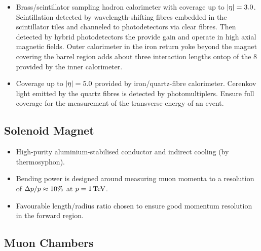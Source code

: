 \begin{itemize}
    \item Brass/scintillator sampling hadron calorimeter with coverage up to
        ${|\eta|=3.0}$. Scintillation detected by wavelength-shifting fibres
        embedded in the scintillator tiles and channeled to photodetectors
        via clear fibres. Then detected by hybrid photodetectors the provide
        gain and operate in high axial magnetic fields. Outer calorimeter
        in the iron return yoke beyond the magnet covering the barrel region
        adds about three interaction lengths ontop of the 8 provided by the
        inner calorimeter.
    \item Coverage up to ${|\eta|=5.0}$ provided by iron/quartz-fibre
        calorimeter. Cerenkov light emitted by the quartz fibres is detected by
        photomultiplers. Ensure full coverage for the measurement of the
        transverse energy of an event.
\end{itemize}

\subsection{Solenoid Magnet}

\begin{itemize}
    \item High-purity aluminium-stabilised conductor and indirect cooling (by
        thermosyphon).
    \item Bending power is designed around measuring muon momenta to a
        resolution of ${\Delta p/p\approx 10\%}$ at ${p = \SI{1}{TeV}}$.
    \item Favourable length/radius ratio chosen to ensure good momentum
        resolution in the forward region.
\end{itemize}

\subsection{Muon Chambers}

